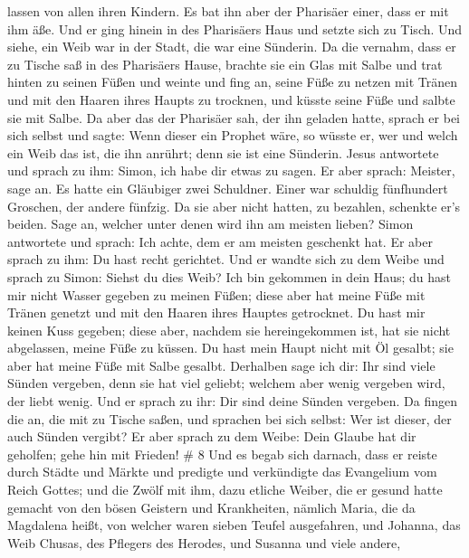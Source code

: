 lassen von allen ihren Kindern.  Es bat ihn aber der
Pharisäer einer, dass er mit ihm äße. Und er ging hinein in des
Pharisäers Haus und setzte sich zu Tisch.  Und siehe, ein
Weib war in der Stadt, die war eine Sünderin. Da die vernahm, dass er zu
Tische saß in des Pharisäers Hause, brachte sie ein Glas mit Salbe
 und trat hinten zu seinen Füßen und weinte und fing an,
seine Füße zu netzen mit Tränen und mit den Haaren ihres Haupts zu
trocknen, und küsste seine Füße und salbte sie mit Salbe. 
Da aber das der Pharisäer sah, der ihn geladen hatte, sprach er bei sich
selbst und sagte: Wenn dieser ein Prophet wäre, so wüsste er, wer und
welch ein Weib das ist, die ihn anrührt; denn sie ist eine Sünderin.
 Jesus antwortete und sprach zu ihm: Simon, ich habe dir
etwas zu sagen. Er aber sprach: Meister, sage an.  Es hatte
ein Gläubiger zwei Schuldner. Einer war schuldig fünfhundert Groschen,
der andere fünfzig.  Da sie aber nicht hatten, zu bezahlen,
schenkte er's beiden. Sage an, welcher unter denen wird ihn am meisten
lieben?  Simon antwortete und sprach: Ich achte, dem er am
meisten geschenkt hat. Er aber sprach zu ihm: Du hast recht gerichtet.
 Und er wandte sich zu dem Weibe und sprach zu Simon:
Siehst du dies Weib? Ich bin gekommen in dein Haus; du hast mir nicht
Wasser gegeben zu meinen Füßen; diese aber hat meine Füße mit Tränen
genetzt und mit den Haaren ihres Hauptes getrocknet.  Du
hast mir keinen Kuss gegeben; diese aber, nachdem sie hereingekommen
ist, hat sie nicht abgelassen, meine Füße zu küssen.  Du
hast mein Haupt nicht mit Öl gesalbt; sie aber hat meine Füße mit Salbe
gesalbt.  Derhalben sage ich dir: Ihr sind viele Sünden
vergeben, denn sie hat viel geliebt; welchem aber wenig vergeben wird,
der liebt wenig.  Und er sprach zu ihr: Dir sind deine
Sünden vergeben.  Da fingen die an, die mit zu Tische
saßen, und sprachen bei sich selbst: Wer ist dieser, der auch Sünden
vergibt?  Er aber sprach zu dem Weibe: Dein Glaube hat dir
geholfen; gehe hin mit Frieden! \# 8  Und es begab sich
darnach, dass er reiste durch Städte und Märkte und predigte und
verkündigte das Evangelium vom Reich Gottes; und die Zwölf mit ihm,
 dazu etliche Weiber, die er gesund hatte gemacht von den
bösen Geistern und Krankheiten, nämlich Maria, die da Magdalena heißt,
von welcher waren sieben Teufel ausgefahren,  und Johanna,
das Weib Chusas, des Pflegers des Herodes, und Susanna und viele andere,
